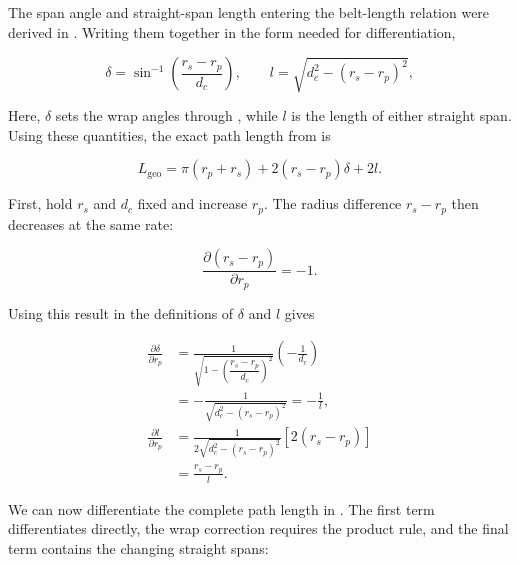 \documentclass[11pt]{report}
\numberwithin{equation}{section}
\begin{document}
The span angle and straight-span length entering the belt-length relation were
derived in
. Writing them together
in the form needed for differentiation,

\begin{equation}
    \delta
    =
    \sin^{-1}\!\left(\frac{r_s-r_p}{d_c}\right),
    \qquad
    l
    =
    \sqrt{d_c^2-(r_s-r_p)^2},
    \label{eq:belt_rate_geometry_recalled}
\end{equation}

Here, \(\delta\) sets the wrap angles through
, while \(l\) is the length of either straight
span. Using these quantities, the exact path length from
 is

\begin{equation}
    L_{\mathrm{geo}}
    =
    \pi(r_p+r_s)
    +
    2(r_s-r_p)\delta
    +
    2l.
    \label{eq:belt_length_rate_form}
\end{equation}

First, hold \(r_s\) and \(d_c\) fixed and increase \(r_p\). The radius difference
\(r_s-r_p\) then decreases at the same rate:

\begin{equation}
    \frac{\partial(r_s-r_p)}{\partial r_p}=-1.
    \label{eq:radius_difference_primary_derivative}
\end{equation}

Using this result in the definitions of \(\delta\) and \(l\) gives

\begin{align}
    \frac{\partial\delta}{\partial r_p}
    &=
    \frac{1}
    {\sqrt{1-\left(\dfrac{r_s-r_p}{d_c}\right)^2}}
    \left(-\frac{1}{d_c}\right)
    \nonumber\\
    &=
    -\frac{1}
    {\sqrt{d_c^2-(r_s-r_p)^2}}
    =
    -\frac{1}{l},
    \label{eq:span_angle_primary_derivative}\\[8pt]
    \frac{\partial l}{\partial r_p}
    &=
    \frac{1}
    {2\sqrt{d_c^2-(r_s-r_p)^2}}
    \left[2(r_s-r_p)\right]
    \nonumber\\
    &=
    \frac{r_s-r_p}{l}.
    \label{eq:straight_span_primary_derivative}
\end{align}

We can now differentiate the complete path length in
. The first term differentiates directly, the
wrap correction requires the product rule, and the final term contains the
changing straight spans:
\end{document}
